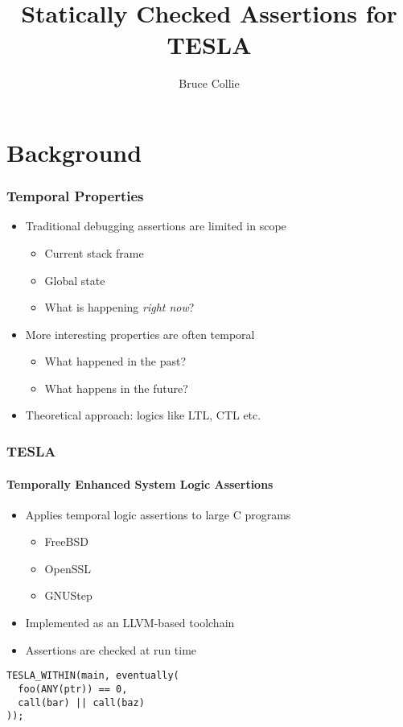 \documentclass{beamer}
\title{Statically Checked Assertions for TESLA}
\author{Bruce Collie}
\begin{document}
\frame{\titlepage}

\begin{frame}
  \tableofcontents
\end{frame}

\section{Background}

\begin{frame}
  \frametitle{Temporal Properties}

  \begin{itemize}
    \item Traditional debugging assertions are limited in scope
      \begin{itemize}
        \item Current stack frame
        \item Global state
        \item What is happening \emph{right now}?
      \end{itemize}
    \item More interesting properties are often temporal
      \begin{itemize}
        \item What happened in the past?
        \item What happens in the future?
      \end{itemize}
    \item Theoretical approach: logics like LTL, CTL etc.
  \end{itemize}
\end{frame}

\begin{frame}[fragile]
  \frametitle{TESLA}
  \framesubtitle{\textbf{T}emporally \textbf{E}nhanced \textbf{S}ystem
  \textbf{L}ogic \textbf{A}ssertions}

  \begin{itemize}
    \item Applies temporal logic assertions to large C programs
      \begin{itemize}
        \item FreeBSD
        \item OpenSSL
        \item GNUStep
      \end{itemize}

    \item Implemented as an LLVM-based toolchain

    \item Assertions are checked at run time
  \end{itemize}

  \begin{center}
    \begin{minipage}{0.5\textwidth}
      \begin{verbatim}
TESLA_WITHIN(main, eventually(
  foo(ANY(ptr)) == 0,
  call(bar) || call(baz)
));
      \end{verbatim}
    \end{minipage}
  \end{center}
\end{frame}
\end{document}
